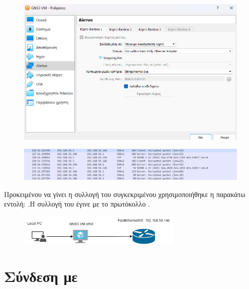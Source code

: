 \begin{figure}[htb]
	\centering
	\includegraphics[width=1.0\textwidth]{graphics/network_config_GNS3.png}
	\caption{ }
\end{figure}

\FloatBarrier

\begin{figure}[htb]
	\centering
	\includegraphics[width=1.0\textwidth]{graphics/ssh_connection.png}
	\caption{ }
\end{figure}


Προκειμένου να γίνει η συλλογή του συγκεκριμένου  χρησιμοποιήθηκε η παρακάτω εντολή:
.Η συλλογή του  έγινε με το πρωτόκολλο .

\FloatBarrier

\begin{figure}[h]
	\centering
	\includegraphics[width=0.7\textwidth]{graphics/jason1.png}
	\caption{ }
\end{figure}

\FloatBarrier

\section{Σύνδεση με  }

